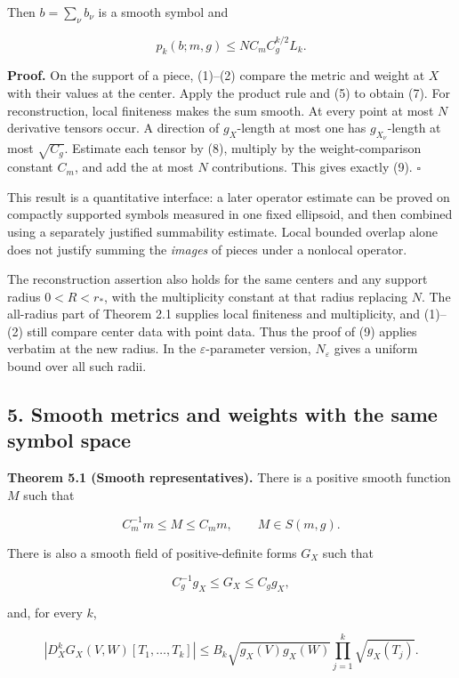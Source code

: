 \documentclass[
  11pt,
]{article}
\begin{document}
Then \(b=\sum_\nu b_\nu\) is a smooth symbol and

\[
p_k(b;m,g)\leq NC_m C_g^{k/2}L_k.                             \tag{9}
\]

\textbf{Proof.} On the support of a piece, (1)--(2) compare the metric
and weight at \(X\) with their values at the center. Apply the product
rule and (5) to obtain (7). For reconstruction, local finiteness makes
the sum smooth. At every point at most \(N\) derivative tensors occur. A
direction of \(g_X\)-length at most one has \(g_{X_\nu}\)-length at most
\(\sqrt{C_g}\). Estimate each tensor by (8), multiply by the
weight-comparison constant \(C_m\), and add the at most \(N\)
contributions. This gives exactly (9). \(\square\)

This result is a quantitative interface: a later operator estimate can
be proved on compactly supported symbols measured in one fixed
ellipsoid, and then combined using a separately justified summability
estimate. Local bounded overlap alone does not justify summing the
\emph{images} of pieces under a nonlocal operator.

The reconstruction assertion also holds for the same centers and any
support radius \(0<R<r_*\), with the multiplicity constant at that
radius replacing \(N\). The all-radius part of Theorem 2.1 supplies
local finiteness and multiplicity, and (1)--(2) still compare center
data with point data. Thus the proof of (9) applies verbatim at the new
radius. In the \(\varepsilon\)-parameter version, \(N_\varepsilon\)
gives a uniform bound over all such radii.

\subsection{5. Smooth metrics and weights with the same symbol
space}\label{smooth-metrics-and-weights-with-the-same-symbol-space}

\textbf{Theorem 5.1 (Smooth representatives).} There is a positive
smooth function \(M\) such that

\[
C_m^{-1}m\leq M\leq C_m m,
\qquad M\in S(m,g).                                           \tag{10}
\]

There is also a smooth field of positive-definite forms \(G_X\) such
that

\[
C_g^{-1}g_X\leq G_X\leq C_g g_X,                              \tag{11}
\]

and, for every \(k\),

\[
\left|D_X^kG_X(V,W)[T_1,\ldots,T_k]\right|
\leq B_k\sqrt{g_X(V)g_X(W)}\prod_{j=1}^k\sqrt{g_X(T_j)}.       \tag{12}
\]
\end{document}
